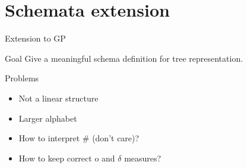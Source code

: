 \section{Schemata extension}
\begin{frame}{Extension to GP}
  \begin{block}{Goal}
    Give a meaningful schema definition for tree representation.
  \end{block}

  \begin{block}{Problems}
    \begin{itemize}
      \item Not a linear structure
      \item Larger alphabet
      \item How to interpret \# (don't care)?
      \item How to keep correct o and $\delta$ measures?
    \end{itemize}
  \end{block}
\end{frame}

